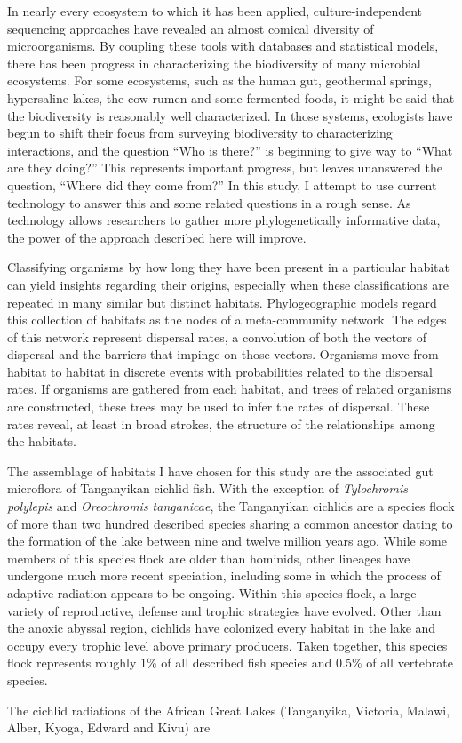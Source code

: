 In nearly every ecosystem to which it has been applied, culture-independent sequencing approaches have revealed an almost comical diversity of microorganisms. By coupling these tools with databases and statistical models, there has been progress in characterizing the biodiversity of many microbial ecosystems. For some ecosystems, such as the human gut, geothermal springs, hypersaline lakes, the cow rumen and some fermented foods, it might be said that the biodiversity is reasonably well characterized. In those systems, ecologists have begun to shift their focus from surveying biodiversity to characterizing interactions, and the question ``Who is there?'' is beginning to give way to ``What are they doing?'' This represents important progress, but leaves unanswered the question, ``Where did they come from?'' In this study, I attempt to use current technology to answer this and some related questions in a rough sense. As technology allows researchers to gather more phylogenetically informative data, the power of the approach described here will improve.

Classifying organisms by how long they have been present in a particular habitat can yield insights regarding their origins, especially when these classifications are repeated in many similar but distinct habitats. Phylogeographic models regard this collection of habitats as the nodes of a meta-community network. The edges of this network represent dispersal rates, a convolution of both the vectors of dispersal and the barriers that impinge on those vectors. Organisms move from habitat to habitat in discrete events with probabilities related to the dispersal rates. If organisms are gathered from each habitat, and trees of related organisms are constructed, these trees may be used to infer the rates of dispersal. These rates reveal, at least in broad strokes, the structure of the relationships among the habitats.

The assemblage of habitats I have chosen for this study are the associated gut microflora of Tanganyikan cichlid fish. With the exception of {\em Tylochromis polylepis} and {\em Oreochromis tanganicae}, the Tanganyikan cichlids are a species flock of more than two hundred described species sharing a common ancestor dating to the formation of the lake between nine and twelve million years ago. While some members of this species flock are older than hominids, other lineages have undergone much more recent speciation, including some in which the process of adaptive radiation appears to be ongoing. Within this species flock, a large variety of reproductive, defense and trophic strategies have evolved. Other than the anoxic abyssal region, cichlids have colonized every habitat in the lake and occupy every trophic level above primary producers. Taken together, this species flock represents roughly 1\% of all described fish species and 0.5\% of all vertebrate species.

The cichlid radiations of the African Great Lakes (Tanganyika, Victoria, Malawi, Alber, Kyoga, Edward and Kivu) are 
